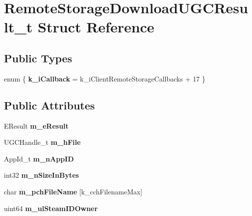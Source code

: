 \hypertarget{structRemoteStorageDownloadUGCResult__t}{}\section{Remote\+Storage\+Download\+U\+G\+C\+Result\+\_\+t Struct Reference}
\label{structRemoteStorageDownloadUGCResult__t}
\subsection*{Public Types}
\begin{DoxyCompactItemize}
\item 
\hypertarget{structRemoteStorageDownloadUGCResult__t_aa775730f5266c152ea8a84b470c4cc63}{}enum \{ {\bfseries k\+\_\+i\+Callback} = k\+\_\+i\+Client\+Remote\+Storage\+Callbacks + 17
 \}\label{structRemoteStorageDownloadUGCResult__t_aa775730f5266c152ea8a84b470c4cc63}

\end{DoxyCompactItemize}
\subsection*{Public Attributes}
\begin{DoxyCompactItemize}
\item 
\hypertarget{structRemoteStorageDownloadUGCResult__t_a3ac63272e086be4736891ce05f66298a}{}E\+Result {\bfseries m\+\_\+e\+Result}\label{structRemoteStorageDownloadUGCResult__t_a3ac63272e086be4736891ce05f66298a}

\item 
\hypertarget{structRemoteStorageDownloadUGCResult__t_afe4999ff833974b5185664d103dbc01d}{}U\+G\+C\+Handle\+\_\+t {\bfseries m\+\_\+h\+File}\label{structRemoteStorageDownloadUGCResult__t_afe4999ff833974b5185664d103dbc01d}

\item 
\hypertarget{structRemoteStorageDownloadUGCResult__t_acd2ce36445001e09db4bddd785a8b1cd}{}App\+Id\+\_\+t {\bfseries m\+\_\+n\+App\+I\+D}\label{structRemoteStorageDownloadUGCResult__t_acd2ce36445001e09db4bddd785a8b1cd}

\item 
\hypertarget{structRemoteStorageDownloadUGCResult__t_a018726022adeb4bd79b229b6b8e45701}{}int32 {\bfseries m\+\_\+n\+Size\+In\+Bytes}\label{structRemoteStorageDownloadUGCResult__t_a018726022adeb4bd79b229b6b8e45701}

\item 
\hypertarget{structRemoteStorageDownloadUGCResult__t_a43e6665bc0e47b33ac1312ef491e8834}{}char {\bfseries m\+\_\+pch\+File\+Name} \mbox{[}k\+\_\+cch\+Filename\+Max\mbox{]}\label{structRemoteStorageDownloadUGCResult__t_a43e6665bc0e47b33ac1312ef491e8834}

\item 
\hypertarget{structRemoteStorageDownloadUGCResult__t_ad15e8f485ad8d4e7b089b0d37f6c4bcb}{}uint64 {\bfseries m\+\_\+ul\+Steam\+I\+D\+Owner}\label{structRemoteStorageDownloadUGCResult__t_ad15e8f485ad8d4e7b089b0d37f6c4bcb}

\end{DoxyCompactItemize}


